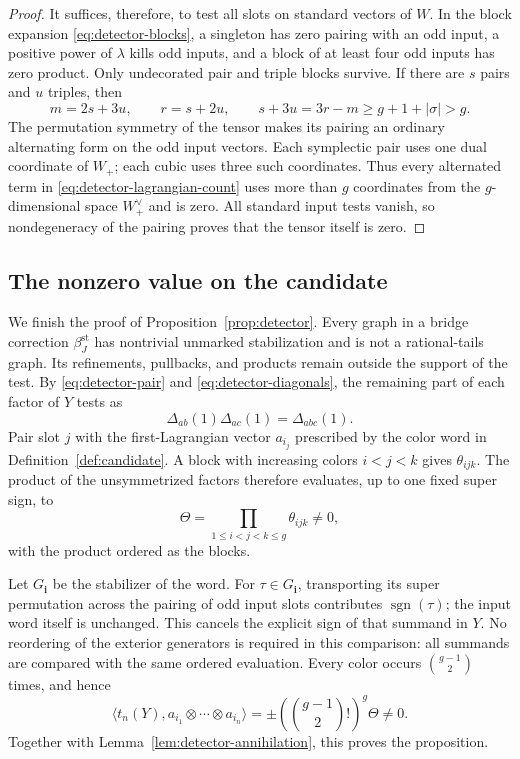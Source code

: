 \begin{proof}
It suffices, therefore, to test all slots on standard
vectors of \(W\).  In the block expansion \eqref{eq:detector-blocks}, a singleton
has zero pairing with an odd input, a positive power of
\(\lambda\) kills odd inputs, and a block of at least four
odd inputs has zero product.  Only undecorated pair and
triple blocks survive.  If there are \(s\) pairs and \(u\)
triples, then
\begin{equation}
 m=2s+3u,\qquad r=s+2u,\qquad
 s+3u=3r-m\geq g+1+|\sigma|>g.
 \label{eq:detector-lagrangian-count}
\end{equation}
The permutation symmetry of the tensor makes its pairing
an ordinary alternating form on the odd input vectors.
Each symplectic pair uses one dual coordinate of \(W_+\);
each cubic uses three such coordinates.  Thus every
alternated term in \eqref{eq:detector-lagrangian-count} uses more than \(g\) coordinates
from the \(g\)-dimensional space \(W_+^\vee\) and is zero.
All standard input tests vanish, so nondegeneracy of the
pairing proves that the tensor itself is zero.
\end{proof}

\subsection{The nonzero value on the candidate}

We finish the proof of Proposition~\ref{prop:detector}.
Every graph in a bridge correction
\(\beta_J^{\mathrm{st}}\) has nontrivial unmarked
stabilization and is not a rational-tails graph.
Its refinements, pullbacks, and products remain outside
the support of the test.  By
\eqref{eq:detector-pair} and \eqref{eq:detector-diagonals},
the remaining part of each factor of \(Y\) tests as
\[
 \Delta_{ab}(1)\Delta_{ac}(1)=\Delta_{abc}(1).
\]
Pair slot \(j\) with the first-Lagrangian vector
\(a_{i_j}\) prescribed by the color word in
Definition~\ref{def:candidate}.  A block with increasing
colors \(i<j<k\) gives \(\theta_{ijk}\).  The product of
the unsymmetrized factors therefore evaluates, up to one
fixed super sign, to
\[
 \Theta=\prod_{1\leq i<j<k\leq g}\theta_{ijk}\neq0,
\]
with the product ordered as the blocks.

Let \(G_{\mathbf i}\) be the stabilizer of the word.
For \(\tau\in G_{\mathbf i}\), transporting its super
permutation across the pairing of odd input slots
contributes \(\operatorname{sgn}(\tau)\); the input word
itself is unchanged.  This cancels the explicit sign of
that summand in \(Y\).  No reordering of the exterior
generators is required in this comparison: all summands
are compared with the same ordered evaluation.
Every color occurs \(\binom{g-1}{2}\) times, and hence
\begin{equation}
 \bigl\langle t_n(Y),
     a_{i_1}\otimes\cdots\otimes a_{i_n}\bigr\rangle
 =
 \pm\left(\binom{g-1}{2}!\right)^g\Theta\neq0.
 \label{eq:detector-candidate-value}
\end{equation}
Together with Lemma~\ref{lem:detector-annihilation}, this
proves the proposition.
